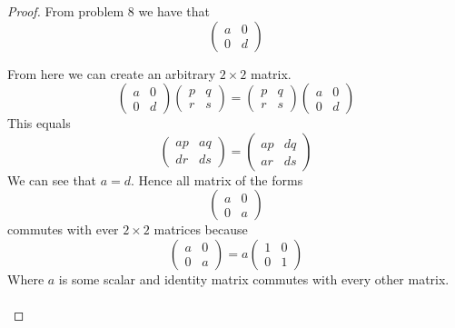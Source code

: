 \documentclass[12pt]{article}
\begin{document}
\begin{proof}
From problem 8 we have that 
$$\begin{pmatrix}
	a & 0\\
	0 & d
	\end{pmatrix}
	$$
	
From here we can create an arbitrary $2 \times 2$ matrix. 
$$\begin{pmatrix}
	a & 0\\
	0 & d
	\end{pmatrix}
	\begin{pmatrix}
	p & q \\
	r & s
	\end{pmatrix}
	=
	\begin{pmatrix}
	p & q \\
	r & s
	\end{pmatrix}
	\begin{pmatrix}
	a & 0\\
	0 & d
	\end{pmatrix}
	$$
	This equals 
	$$\begin{pmatrix}
	ap & aq\\
	dr & ds
	\end{pmatrix}
	=
	\begin{pmatrix}
	ap & dq \\
	ar & ds
	\end{pmatrix}
	$$
	We can see that $a=d$. Hence all matrix of the forms 
	$$
	\begin{pmatrix}
	a & 0 \\
	0 &a
	\end{pmatrix}
	$$
	commutes with ever $2 \times 2$ matrices because 
	$$ 
	\begin{pmatrix}
	a & 0 \\
	0 & a
	\end{pmatrix}
	=
	a \begin{pmatrix}
	1 & 0 \\
	0 & 1
	\end{pmatrix}
	$$ 
	Where $a$ is some scalar and identity matrix commutes with every other matrix. \\ \\
\end{proof}


\end{document}
